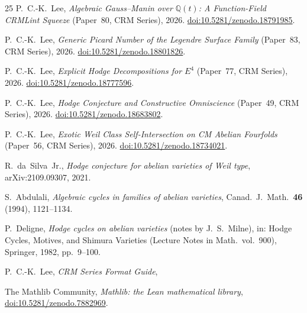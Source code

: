 \documentclass[11pt]{article}
\theoremstyle{plain}
\theoremstyle{definition}
\theoremstyle{remark}
\newcommand{\Q}{\mathbb{Q}}
\begin{document}
\begin{thebibliography}{25}
P.~C.-K.~Lee,
\emph{Algebraic Gauss--Manin over $\Q(t)$: A Function-Field
CRMLint Squeeze} (Paper~80, CRM Series),
2026.
\href{https://doi.org/10.5281/zenodo.18791985}{doi:10.5281/zenodo.18791985}.

P.~C.-K.~Lee,
\emph{Generic Picard Number of the Legendre Surface Family}
(Paper~83, CRM Series),
2026.
\href{https://doi.org/10.5281/zenodo.18801826}{doi:10.5281/zenodo.18801826}.

P.~C.-K.~Lee,
\emph{Explicit Hodge Decompositions for $E^4$} (Paper~77, CRM Series),
2026.
\href{https://doi.org/10.5281/zenodo.18777596}{doi:10.5281/zenodo.18777596}.

P.~C.-K.~Lee,
\emph{Hodge Conjecture and Constructive Omniscience}
(Paper~49, CRM Series),
2026.
\href{https://doi.org/10.5281/zenodo.18683802}{doi:10.5281/zenodo.18683802}.

P.~C.-K.~Lee,
\emph{Exotic Weil Class Self-Intersection on CM Abelian Fourfolds}
(Paper~56, CRM Series),
2026.
\href{https://doi.org/10.5281/zenodo.18734021}{doi:10.5281/zenodo.18734021}.

R.~da~Silva~Jr.,
\emph{Hodge conjecture for abelian varieties of Weil type},
arXiv:2109.09307, 2021.


S.~Abdulali,
\emph{Algebraic cycles in families of abelian varieties},
Canad.\ J.\ Math.\ \textbf{46} (1994), 1121--1134.

P.~Deligne,
\emph{Hodge cycles on abelian varieties}
(notes by J.~S.~Milne),
in: Hodge Cycles, Motives, and Shimura Varieties
(Lecture Notes in Math.\ vol.~900), Springer, 1982, pp.~9--100.

P.~C.-K.~Lee,
\emph{CRM Series Format Guide},

The Mathlib Community,
\emph{Mathlib: the Lean mathematical library},
\href{https://doi.org/10.5281/zenodo.7882969}{doi:10.5281/zenodo.7882969}.

\end{thebibliography}
\end{document}
